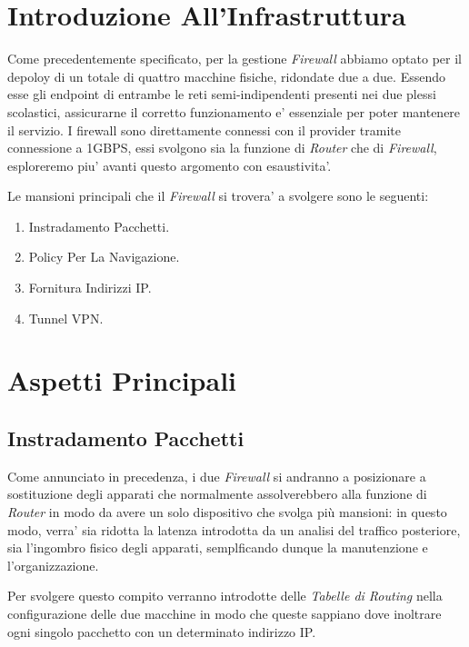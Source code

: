 \documentclass{report}
\begin{document}
		\section{Introduzione All'Infrastruttura}
			Come precedentemente specificato, per la gestione \emph{Firewall} abbiamo optato per il depoloy di un totale di
			quattro macchine fisiche, ridondate due a due. Essendo esse gli endpoint di entrambe le reti semi-indipendenti 
			presenti nei due plessi scolastici, assicurarne il corretto funzionamento e' essenziale per poter mantenere
			il servizio.
			I firewall sono direttamente connessi con il provider tramite connessione a 1GBPS, essi svolgono sia la funzione 
			di \emph{Router} che di \emph{Firewall}, esploreremo piu' avanti questo argomento con esaustivita'.

			Le mansioni principali che il \emph{Firewall} si trovera' a svolgere sono le seguenti:
			\begin{enumerate}
				\item Instradamento Pacchetti.
				\item Policy Per La Navigazione.
				\item Fornitura Indirizzi IP.
				\item Tunnel VPN.
			\end{enumerate}
		\section{Aspetti Principali}
			\subsection{Instradamento Pacchetti}
				Come annunciato in precedenza, i due \emph{Firewall} si andranno a posizionare a sostituzione degli apparati
				che normalmente assolverebbero alla funzione di \emph{Router} in modo da avere un solo dispositivo che svolga
				più mansioni: in questo modo, verra' sia ridotta la latenza introdotta da un analisi del traffico posteriore,
				sia l'ingombro fisico degli apparati, semplficando dunque la manutenzione e l'organizzazione.

				Per svolgere questo compito verranno introdotte delle \emph{Tabelle di Routing} nella configurazione delle due
				macchine in modo che queste sappiano dove inoltrare ogni singolo pacchetto con un determinato indirizzo IP.
\end{document}
